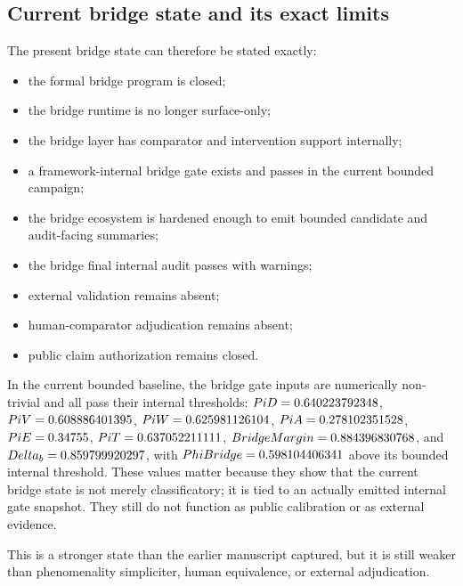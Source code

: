 \documentclass[11pt,a4paper]{article}
\theoremstyle{definition}
\newcommand{\PiD}{\Pi_{\mathrm{D}}}
\newcommand{\PiV}{\Pi_{\mathrm{V}}}
\newcommand{\PiW}{\Pi_{\mathrm{W}}}
\newcommand{\PiA}{\Pi_{\mathrm{A}}}
\newcommand{\PiE}{\Pi_{\mathrm{E}}}
\newcommand{\PiT}{\Pi_{\mathrm{T}}}
\newcommand{\PhiBridge}{\Phi_{\mathrm{bpf}}}
\newcommand{\BridgeMargin}{\mathcal{R}_{\mathrm{b}}}
\begin{document}
\subsection{Current bridge state and its exact limits}
The present bridge state can therefore be stated exactly:
\begin{itemize}[leftmargin=1.5em]
\item the formal bridge program is closed;
\item the bridge runtime is no longer surface-only;
\item the bridge layer has comparator and intervention support internally;
\item a framework-internal bridge gate exists and passes in the current bounded campaign;
\item the bridge ecosystem is hardened enough to emit bounded candidate and audit-facing summaries;
\item the bridge final internal audit passes with warnings;
\item external validation remains absent;
\item human-comparator adjudication remains absent;
\item public claim authorization remains closed.
\end{itemize}
In the current bounded baseline, the bridge gate inputs are numerically non-trivial and all pass their internal thresholds: $\\PiD=0.640223792348$, $\\PiV=0.608886401395$, $\\PiW=0.625981126104$, $\\PiA=0.278102351528$, $\\PiE=0.34755$, $\\PiT=0.637052211111$, $\\BridgeMargin=0.884396830768$, and $\\Delta_b=0.859799920297$, with $\\PhiBridge=0.598104406341$ above its bounded internal threshold. These values matter because they show that the current bridge state is not merely classificatory; it is tied to an actually emitted internal gate snapshot. They still do not function as public calibration or as external evidence.

This is a stronger state than the earlier manuscript captured, but it is still weaker than phenomenality simpliciter, human equivalence, or external adjudication.
\end{document}
